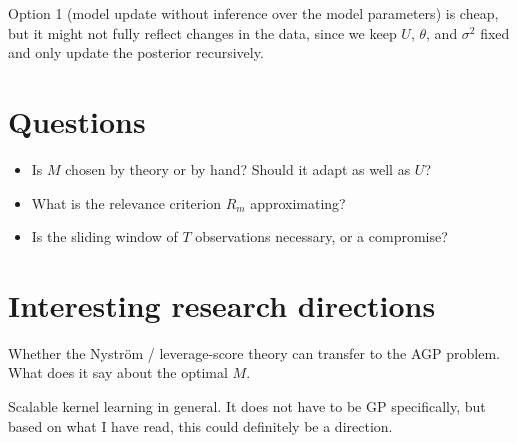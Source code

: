 \documentclass[11pt,a4paper]{article}
\begin{document}
Option 1 (model update without inference over the model parameters) is cheap, but it might not fully reflect changes in the data, since we keep $U$, $\theta$, and $\sigma^2$ fixed and only update the posterior recursively.

\section*{Questions}

\begin{itemize}
  \item Is $M$ chosen by theory or by hand? Should it adapt as well as $U$?
  \item What is the relevance criterion $R_m$ approximating?
  \item Is the sliding window of $T$ observations necessary, or a compromise?
\end{itemize}

\section*{Interesting research directions}

Whether the Nyström / leverage-score theory can transfer to the AGP problem. What does it say about the optimal $M$.

Scalable kernel learning in general. It does not have to be GP specifically, but based on what I have read, this could definitely be a direction.
\end{document}
